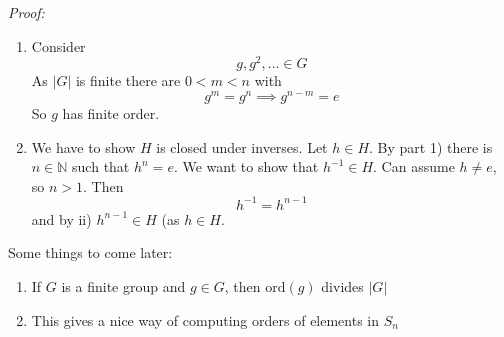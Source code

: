 \documentclass{report}
\theoremstyle{remark}
\theoremstyle{definition}
\theoremstyle{definition}
\theoremstyle{theorem}
\begin{document}
\emph{Proof:} \begin{enumerate}[label=\arabic*)]
    \item Consider
    \[g,g^2,... \in G\]
    As $|G|$ is finite there are $0<m<n$ with
    \[g^m=g^n \implies g^{n-m}=e\]
    So $g$ has finite order.
    \item We have to show $H$ is closed under inverses. Let $h \in H$. By part 1) there is $n \in \mathbb{N}$ such that $h^n=e$. We want to show that $h^{-1} \in H$. Can assume $h \neq e$, so $n>1$. Then
    \[h^{-1}=h^{n-1}\]
    and by ii) $h^{n-1} \in H$ (as $h \in H$.
\end{enumerate}
Some things to come later:
\begin{enumerate}[label=\textcircled{\tiny{\Alph*}}]
    \item If $G$ is a finite group and $g \in G$, then $\mathrm{ord}(g)$ divides $|G|$
    \item This gives a nice way of computing orders of elements in $S_n$
\end{enumerate}
\end{document}

